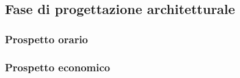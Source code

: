 \subsection{Fase di progettazione architetturale}
\subsubsection{Prospetto orario}
\subsubsection{Prospetto economico}


